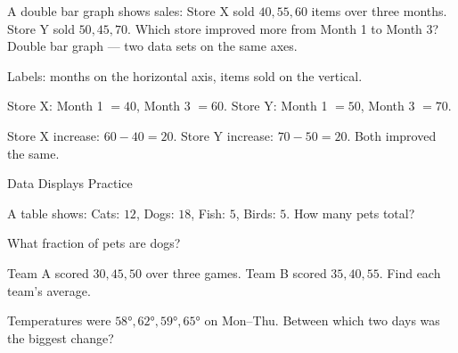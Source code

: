 \begin{stepExample}{A double bar graph shows sales: Store X sold $40, 55, 60$ items over three months. Store Y sold $50, 45, 70$. Which store improved more from Month 1 to Month 3?}
     Double bar graph — two data sets on the same axes.

     Labels: months on the horizontal axis, items sold on the vertical.

     Store X: Month 1 $= 40$, Month 3 $= 60$. Store Y: Month 1 $= 50$, Month 3 $= 70$.

     Store X increase: $60 - 40 = 20$. Store Y increase: $70 - 50 = 20$. Both improved the same.
\end{stepExample}


\newpage
\begin{stepPractice}{Data Displays Practice}
    \resetProblems

    \prob A table shows: Cats: $12$, Dogs: $18$, Fish: $5$, Birds: $5$. How many pets total? \answerBlank[2.5cm]

    \prob What fraction of pets are dogs? \answerBlank[2.5cm]

    \prob Team A scored $30, 45, 50$ over three games. Team B scored $35, 40, 55$. Find each team's average. \answerBlank[3cm]

    \prob Temperatures were $58°, 62°, 59°, 65°$ on Mon--Thu. Between which two days was the biggest change? \answerBlank[3cm]

\end{stepPractice}
